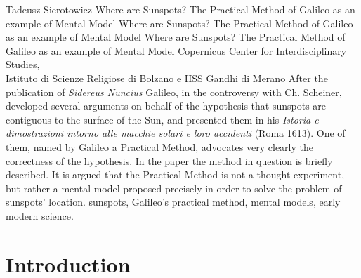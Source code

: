 \begin{artengenv}
	{Tadeusz Sierotowicz}
	{Where are Sunspots? The Practical Method of Galileo as an example of Mental Model}
	{Where are Sunspots? The Practical Method of Galileo as an example of Mental Model}
	{Where are Sunspots? The Practical Method of Galileo as an example of Mental Model}
	{Copernicus Center for Interdisciplinary Studies,\\
		Istituto di Scienze Religiose di Bolzano e IISS Gandhi di Merano}
	{After the publication of \textit{Sidereus Nuncius} Galileo, in the controversy with Ch.
		Scheiner, developed several arguments on behalf of the hypothesis that sunspots are contiguous to the surface of the
		Sun, and presented them in his \textit{Istoria e dimostrazioni intorno alle macchie solari e loro accidenti}
		(Roma 1613). One of them, named by Galileo a Practical Method, advocates very clearly the correctness of the
		hypothesis. In the paper the method in question is briefly described. It is argued that the Practical Method is not a
		thought experiment, but rather a mental model proposed precisely in order to solve the problem of sunspots’ location. }
	{sunspots, Galileo’s practical method, mental models, early modern science.}
















\section{Introduction}


\end{artengenv}

